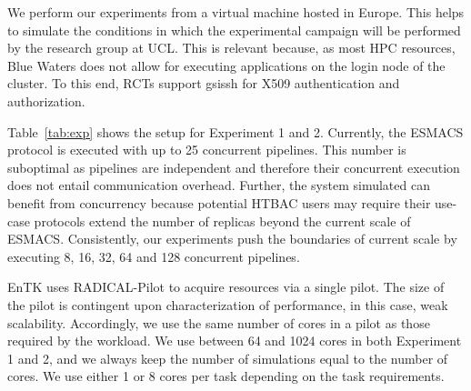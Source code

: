 We perform our experiments from a virtual machine hosted in Europe. This
helps to simulate the conditions in which the experimental campaign will be
performed by the research group at UCL\@. This is relevant because, as most
HPC resources, Blue Waters does not allow for executing applications on the
login node of the cluster. To this end, RCTs support \textmd{gsissh} for X509
authentication and authorization.

Table~\ref{tab:exp} shows
the setup for Experiment 1 and 2. Currently, the ESMACS protocol is executed
with up to 25 concurrent pipelines. This number is suboptimal as pipelines
are independent and therefore their concurrent execution does not entail
communication overhead. Further, the system simulated can benefit from
concurrency because potential HTBAC users may require their use-case protocols extend 
the number of replicas beyond the current scale of ESMACS\@. Consistently, our
experiments push the boundaries of current scale by executing 8, 16, 32, 64
and 128 concurrent pipelines.


EnTK uses RADICAL-Pilot to acquire resources via a single pilot. 
The size of the pilot is contingent upon characterization of performance, in
this case, weak %
scalability. %
Accordingly, we %
use the same number of cores in a pilot %
as %
those required by the workload. 
We use between 64 and 1024 cores in both Experiment 1 and 2, and we always
keep the number of simulations %
equal to the number of cores. %
We 
use either 1 or 8 cores per task %
depending on the task requirements.




